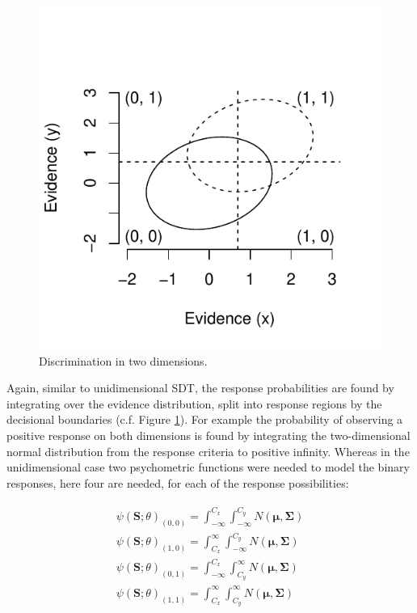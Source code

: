 \documentclass{article}\usepackage{knitr}
\begin{document}
\begin{figure}
\begin{center}
\begin{knitrout}
\color{fgcolor}
\includegraphics[width=\maxwidth]{figure/unnamed-chunk-9-1} 

\end{knitrout}
\end{center}
\caption{Discrimination in two dimensions.}
\label{fig:GRTsimple}
\end{figure}

Again, similar to unidimensional SDT, the response probabilities are found by integrating over the evidence distribution, split into response regions by the decisional boundaries (c.f. Figure \ref{fig:GRTsimple}). For example the probability of observing a positive response on both dimensions is found by  integrating the two-dimensional normal distribution from the response criteria to positive infinity. Whereas in the unidimensional case two psychometric functions were needed to model the binary responses, here four are needed, for each of the response possibilities:

\begin{align}
\begin{split}
\label{eq:probs}
\psi(\bm{S}; \theta)_{(0, 0)}  = \int_{-\infty}^{C_x} \int_{-\infty}^{C_y} N(\bm{\mu}, \bm{\Sigma})
\\
\psi(\bm{S}; \theta)_{(1, 0)}  = \int_{C_x}^{\infty} \int_{-\infty}^{C_y} N(\bm{\mu}, \bm{\Sigma})
\\
\psi(\bm{S}; \theta)_{(0, 1)}  = \int_{-\infty}^{C_x} \int_{C_y}^{\infty} N(\bm{\mu}, \bm{\Sigma})
\\
\psi(\bm{S}; \theta)_{(1, 1)}  = \int_{C_x}^{\infty} \int_{C_y}^{\infty} N(\bm{\mu}, \bm{\Sigma})
\end{split}
\end{align}
\end{document}
